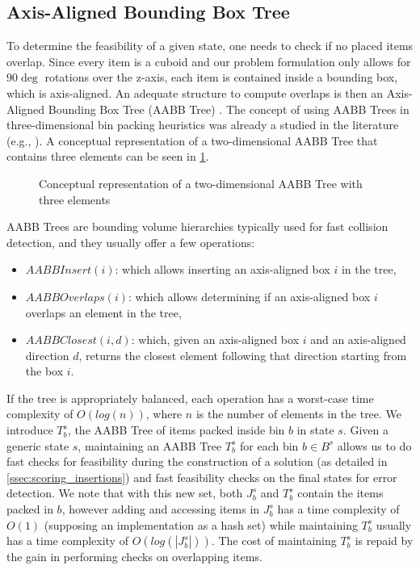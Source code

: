 \subsection{Axis-Aligned Bounding Box Tree}
\label{sec:problem_state:aabbtree}%

To determine the feasibility of a given state, one needs to check if no placed items overlap.
Since every item is a cuboid and our problem formulation only allows for $90\deg$ rotations over the z-axis, each item is contained inside a bounding box, which is axis-aligned.
An adequate structure to compute overlaps is then an Axis-Aligned Bounding Box Tree (AABB Tree) \citep{bergen1997efficient}.
The concept of using AABB Trees in three-dimensional bin packing heuristics was already a studied in the literature (e.g., \cite{ALLEN2011219}).
A conceptual representation of a two-dimensional AABB Tree that contains three elements can be seen in \cref{fig:aabb_tree}.

\begin{figure}
    \label{fig:aabb_tree}%
    
    \caption{Conceptual representation of a two-dimensional AABB Tree with three elements}
\end{figure}

AABB Trees are bounding volume hierarchies typically used for fast collision detection, and they usually offer a few operations:
\begin{itemize}
    \item $AABBInsert(i)$: which allows inserting an axis-aligned box $i$ in the tree,
    \item $AABBOverlaps(i)$: which allows determining if an axis-aligned box $i$ overlaps an element in the tree,
    \item $AABBClosest(i, d)$: which, given an axis-aligned box $i$ and an axis-aligned direction $d$, returns the closest element following that direction starting from the box $i$.
\end{itemize}

If the tree is appropriately balanced, each operation has a worst-case time complexity of $O(log(n))$, where $n$ is the number of elements in the tree.
We introduce $T^s_b$, the AABB Tree of items packed inside bin $b$ in state $s$.
Given a generic state $s$, maintaining an AABB Tree $T^s_b$ for each bin $b \in B^s$ allows us to do fast checks for feasibility during the construction of a solution (as detailed in \ref{ssec:scoring_insertions}) and fast feasibility checks on the final states for error detection.
We note that with this new set, both $J^s_b$ and $T^s_b$ contain the items packed in $b$, however adding and accessing items in $J^s_b$ has a time complexity of $O(1)$ (supposing an implementation as a hash set) while maintaining $T^s_b$ usually has a time complexity of $O(log(|J^s_b|))$.
The cost of maintaining $T^s_b$ is repaid by the gain in performing checks on overlapping items.

